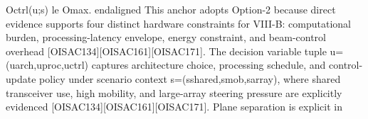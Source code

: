 {}\markdownRendererAmpersand{} O\markdownRendererUnderscore{}\markdownRendererLeftBrace{}ctrl\markdownRendererRightBrace{}(u;s) \markdownRendererBackslash{}le O\markdownRendererUnderscore{}\markdownRendererLeftBrace{}max\markdownRendererRightBrace{}.\markdownRendererSoftLineBreak
{}\markdownRendererBackslash{}end\markdownRendererLeftBrace{}aligned\markdownRendererRightBrace{}\markdownRendererSoftLineBreak
{}\markdownRendererDollarSign{}\markdownRendererDollarSign{}\markdownRendererParagraphSeparator
{}This anchor adopts Option-2 because direct evidence supports four distinct hardware constraints for VIII-B: computational burden, processing-latency envelope, energy constraint, and beam-control overhead [O\markdownRendererUnderscore{}ISAC\markdownRendererUnderscore{}134][O\markdownRendererUnderscore{}ISAC\markdownRendererUnderscore{}161][O\markdownRendererUnderscore{}ISAC\markdownRendererUnderscore{}171]. The decision variable tuple \markdownRendererDollarSign{}u=(u\markdownRendererUnderscore{}\markdownRendererLeftBrace{}arch\markdownRendererRightBrace{},u\markdownRendererUnderscore{}\markdownRendererLeftBrace{}proc\markdownRendererRightBrace{},u\markdownRendererUnderscore{}\markdownRendererLeftBrace{}ctrl\markdownRendererRightBrace{})\markdownRendererDollarSign{} captures architecture choice, processing schedule, and control-update policy under scenario context \markdownRendererDollarSign{}s=(s\markdownRendererUnderscore{}\markdownRendererLeftBrace{}shared\markdownRendererRightBrace{},s\markdownRendererUnderscore{}\markdownRendererLeftBrace{}mob\markdownRendererRightBrace{},s\markdownRendererUnderscore{}\markdownRendererLeftBrace{}array\markdownRendererRightBrace{})\markdownRendererDollarSign{}, where shared transceiver use, high mobility, and large-array steering pressure are explicitly evidenced [O\markdownRendererUnderscore{}ISAC\markdownRendererUnderscore{}134][O\markdownRendererUnderscore{}ISAC\markdownRendererUnderscore{}161][O\markdownRendererUnderscore{}ISAC\markdownRendererUnderscore{}171]. Plane separation is explicit in 
